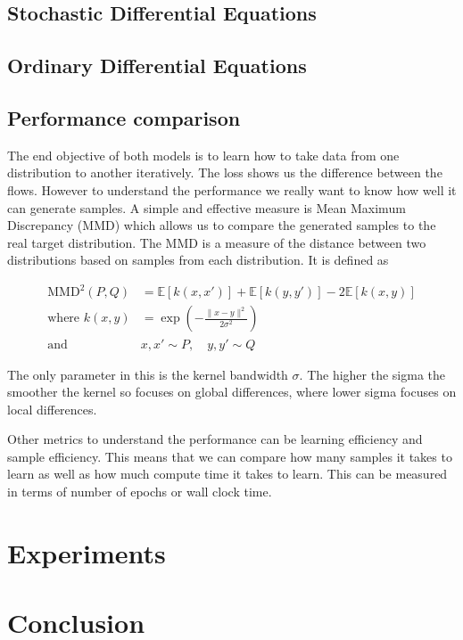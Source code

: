 \documentclass[conference,a4paper]{IEEEtran}
\begin{document}
\subsection{Stochastic Differential Equations}


\subsection{Ordinary Differential Equations}

\subsection{Performance comparison}

The end objective of both models is to learn how to take data from one distribution to another iteratively. The loss shows us the difference between the flows. However to understand the performance we really want to know how well it can generate samples. A simple and effective measure is Mean Maximum Discrepancy (MMD) \cite{grettonKernelMethodTwoSample2008} which allows us to compare the generated samples to the real target distribution. The MMD is a measure of the distance between two distributions based on samples from each distribution. It is defined as

\begin{align}
    \text{MMD}^2(P, Q) &= \mathbb{E}[k(x, x')] + \mathbb{E}[k(y, y')] - 2\mathbb{E}[k(x, y)]\\
    \text{where } k(x, y) &= \exp\left(-\frac{\|x - y\|^2}{2\sigma^2}\right)\\
    \text{and } &x, x' \sim P, \quad y, y' \sim Q 
\end{align}

The only parameter in this is the kernel bandwidth $\sigma$. The higher the sigma the smoother the kernel so focuses on global differences, where lower sigma focuses on local differences.

Other metrics to understand the performance can be learning efficiency and sample efficiency. This means that we can compare how many samples it takes to learn as well as how much compute time it takes to learn. This can be measured in terms of number of epochs or wall clock time.

\section{Experiments}


\section{Conclusion}
\end{document}
